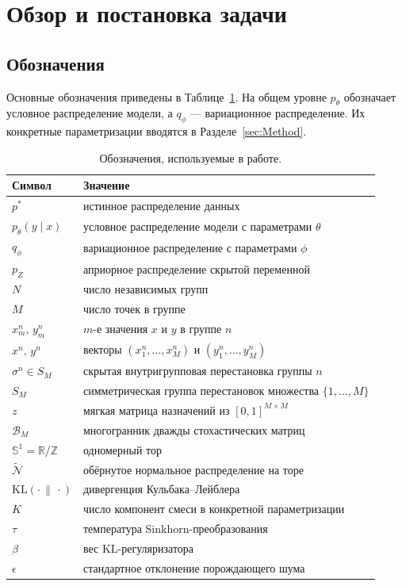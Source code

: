 \section{Обзор и постановка задачи}
\label{sec:Background} 

\subsection{Обозначения}

Основные обозначения приведены в Таблице~\ref{tab:notation}. На общем уровне
$p_\theta$ обозначает условное распределение модели, а $q_\phi$ --- вариационное
распределение. Их конкретные параметризации вводятся в Разделе~\ref{sec:Method}.

\begin{table}[H]
\centering
\caption{Обозначения, используемые в работе.}
\label{tab:notation}
\begin{tabular}{ll}
\toprule
Символ & Значение \\
\midrule
$p^*$ & истинное распределение данных \\
$p_\theta(y\mid x)$ & условное распределение модели с параметрами $\theta$ \\
$q_\phi$ & вариационное распределение с параметрами $\phi$ \\
$p_Z$ & априорное распределение скрытой переменной \\
$N$ & число независимых групп \\
$M$ & число точек в группе \\
$x^n_m,\,y^n_m$ & $m$-е значения $x$ и $y$ в группе $n$ \\
$x^n,\,y^n$ & векторы $(x^n_1,\dots,x^n_M)$ и $(y^n_1,\dots,y^n_M)$ \\
$\sigma^n\in S_M$ & скрытая внутригрупповая перестановка группы $n$ \\
$S_M$ & симметрическая группа перестановок множества $\{1,\dots,M\}$ \\
$z$ & мягкая матрица назначений из $[0,1]^{M\times M}$ \\
$\mathcal{B}_M$ & многогранник дважды стохастических матриц \\
$\mathbb{S}^1=\mathbb{R}/\mathbb{Z}$ & одномерный тор \\
$\tilde{\mathcal{N}}$ & обёрнутое нормальное распределение на торе \\
$\mathrm{KL}(\cdot\,\|\,\cdot)$ & дивергенция Кульбака--Лейблера \\
$K$ & число компонент смеси в конкретной параметризации \\
$\tau$ & температура Sinkhorn-преобразования \\
$\beta$ & вес KL-регуляризатора \\
$\epsilon$ & стандартное отклонение порождающего шума \\
\bottomrule
\end{tabular}
\end{table}

